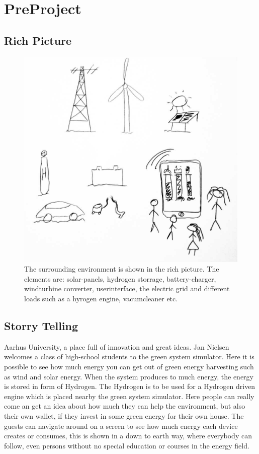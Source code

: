 \section{PreProject}
\subsection{Rich Picture}

\begin{figure}[h!]		%
 \begin{centering}
  \includegraphics[width=1\textwidth]{images/rich_picture1.png}
   \caption{The surrounding environment is shown in the rich picture. The
 			 elements are: solar-panels, hydrogen storrage, battery-charger, windturbine
 			 converter, userinterface, the electric grid and different loads such as a
 			 hyrogen engine, vacumcleaner etc. }
 \end{centering}
\end{figure}


\subsection{Storry Telling}
Aarhus University, a place full of innovation and great ideas. Jan Nielsen
welcomes a class of high-school students to the green system simulator. Here it
is possible to see how much energy you can get out of green energy harvesting
such as wind and solar energy. When the system produces to much energy, the 
energy is stored in form of Hydrogen. The Hydrogen is to be used for a Hydrogen
driven engine which is placed nearby the green system simulator. Here people can
really come an get an idea about how much they can help the environment, but
also their own wallet, if they invest in some green energy for their own house.
The guests can navigate around on a screen to see how much energy each device 
creates or consumes, this is shown in a down to earth way, where everybody can follow, 
even persons without no special education or courses in the energy field.
